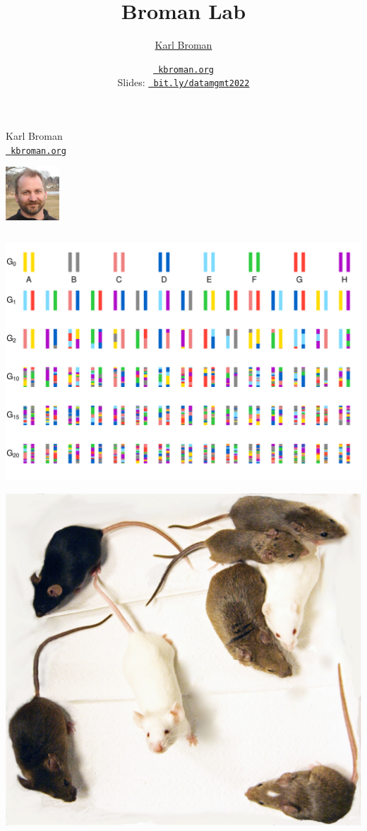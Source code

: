 \documentclass[aspectratio=169,12pt,t]{beamer}
\title{Broman Lab}
\author{\href{https://kbroman.org}{Karl Broman}}
\institute{Biostatistics \& Medical Informatics \\ Univ.\ Wisconsin{\textendash}Madison}
\date{\href{https://kbroman.org}{\tt \scriptsize \color{foreground} kbroman.org}
\\[2pt]
\scriptsize {\lolit Slides:} \href{https://bit.ly/datamgmt2022}{\tt \scriptsize
  \color{foreground} bit.ly/datamgmt2022}
}
\begin{document}
{

\begin{frame}{Karl Broman \\[-6pt]
    \href{https://kbroman.org}{\tt \small \color{foreground} kbroman.org}}

  \vspace*{-15mm} \hspace{30mm}
  \includegraphics[height=20mm]{Figs/karl_2014-03-30_square.jpg}


  \begin{columns}
    \begin{column}{0.40\textwidth}

  \vspace*{0.25\textheight}
  \hspace*{0.05\textwidth}
  \includegraphics[height=0.50\textheight]{Figs/hs_light.pdf}

  \vspace{-0.85\textheight}
  \includegraphics[height=0.30\textheight]{Figs/cc_founders.png}


\end{column}
\end{columns}
\end{frame}}
\end{document}
